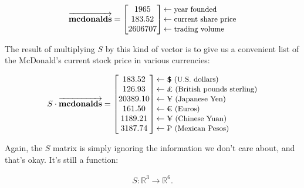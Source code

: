 \vspace{-.3in} 
\begin{align*}
\overrightarrow{\textbf{mcdonalds}} =
\begin{bmatrix}
1965 \\ 183.52 \\ 2606707 \\
\end{bmatrix}
\begin{matrix*}[l]
\leftarrow\textrm{\small{year founded}} \\
\leftarrow\textrm{\small{current share price}} \\
\leftarrow\textrm{\small{trading volume}} \\
\end{matrix*}
\end{align*}
\vspace{-.15in}

The result of multiplying $S$ by this kind of vector is to give us a
convenient list of the McDonald's current stock price in various currencies:

\vspace{-.3in} 
\begin{align*}
S \cdot \overrightarrow{\textbf{mcdonalds}} =
\begin{bmatrix}
183.52 \\ 126.93 \\ 20389.10 \\ 161.50 \\ 1189.21 \\ 3187.74 \\
\end{bmatrix}
\begin{matrix*}[l]
\leftarrow\textrm{\small{\EyesDollar \ (U.S. dollars)}} \\
\leftarrow\textrm{\small{\pounds \ (British pounds sterling)}} \\
\leftarrow\textrm{\small{\textyen \ (Japanese Yen)}} \\
\leftarrow\textrm{\small{\EURtm \ (Euros)}} \\
\leftarrow\textrm{\small{\textyen \ (Chinese Yuan)}} \\
\leftarrow\textrm{\small{\textpeso \ (Mexican Pesos)}} \\
\end{matrix*}
\end{align*}
\vspace{-.15in}

Again, the $S$ matrix is simply ignoring the information we don't care about,
and that's okay. It's still a function:

\vspace{-.15in}
\begin{align*}
S : \mathbb{R}^3 \rightarrow \mathbb{R}^6.
\end{align*}
\vspace{-.15in}
